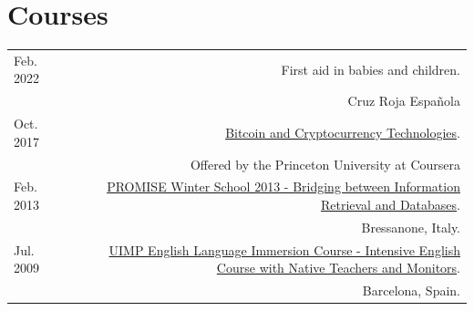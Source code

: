\documentclass[10pt]{article}
\begin{document}
\section*{Courses}
\begin{tabular}{L!{\VRule}R}
	Feb. 2022 & First aid in babies and children. \\
	&\scriptsize{Cruz Roja Española}\vspace{5pt}\\

	Oct. 2017 & \href{}{Bitcoin and Cryptocurrency Technologies}. \\
	&\scriptsize{Offered by the Princeton University at Coursera}\vspace{5pt}\\
	
	Feb. 2013 & \href{http://www.promise-noe.eu/events/winter-school-2013/}{PROMISE Winter School 2013 - Bridging between Information Retrieval and Databases}.\\
	&\scriptsize{Bressanone, Italy.} \vspace{5pt}\\

Jul. 2009 & \href{}{UIMP English Language Immersion Course - Intensive English Course with Native Teachers and Monitors}.\\
&\scriptsize{Barcelona, Spain.} \vspace{5pt}\\
\end{tabular}
\end{document}
